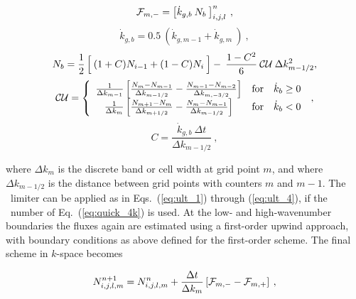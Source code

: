 \begin{equation}
{\cal F}_{m,-} = \left [ \dot{k}_{g,b} \: N_b \: \right ]^n_{i,j,l}
\: , \label{eq:quick_1k}\end{equation} \begin{equation}
\dot{k}_{g,b} = 0.5 \: \left ( \dot{k}_{g,m-1} + \dot{k}_{g,m} 
\: \right )  \: , \label{eq:quick_1ak}
\end{equation} \begin{equation}
N_b = \frac{1}{2} \left [ \rule[0mm]{0mm}{\baselineskip} \: 
(1+C)N_{i-1} + (1-C)N_i \: \right ] - \:
\frac{1-C^2}{6} \: {\cal CU} \: \Delta k^2_{m-1/2}, \label{eq:quick_2k} \end{equation} \begin{equation}
{\cal CU} =  \left \{ \begin{array}{ccc}
\frac{1}{\Delta k_{m-1}}
\left [ \frac{N_{ m }-N_{m-1}}{\Delta k_{m-1/2}} - 
        \frac{N_{m-1}-N_{m-2}}{\Delta k_{m,-3/2}} \right ]
               & \mbox{for} & \dot{k}_b \geq 0 \\
\frac{1}{\Delta k_m}
\left [ \frac{N_{m+1}-N_{ m }}{\Delta k_{m+1/2}} -
       \frac{N_{ m }-N_{m-1}}{\Delta k_{m-1/2}} \right ]
               & \mbox{for} & \dot{k}_b   <  0
\end{array} \right . \: , \label{eq:quick_3k}
\end{equation} \begin{equation}
C = \frac{\dot{k}_{g,b} \: \Delta t}{\Delta k_{m-1/2}}
\: , \label{eq:quick_4k} \end{equation}

\noindent
where $\Delta k_m$ is the discrete band or cell width at grid point $m$, and
where $\Delta k_{m-1/2}$ is the distance between grid points with counters $m$
and $m-1$. The \ult\ limiter can be applied as in Eqs.~(\ref{eq:ult_1})
through (\ref{eq:ult_4}), if the \cfl\ number of Eq.~(\ref{eq:quick_4k}) is
used. At the low- and high-wavenumber boundaries the fluxes again are
estimated using a first-order upwind approach, with boundary conditions as
above defined for the first-order scheme. The final scheme in $k$-space
becomes


\begin{equation}
N_{i,j,l,m}^{n+1} = N_{i,j,l,m}^n 
 + \frac{\Delta t}{\Delta k_m} \left [ {\cal F}_{m,-} - {\cal F}_{m,+} \right ]
\: , \label{eq:uq_k_tot} \end{equation}


\vssub
